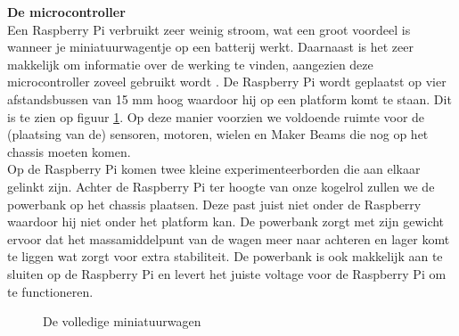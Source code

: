 \documentclass[a4paper,kulak]{kulakarticle}
\begin{document}
\noindent\textbf{\large De microcontroller}\
\\
Een Raspberry Pi verbruikt zeer weinig stroom, wat een groot voordeel is wanneer je miniatuurwagentje op een batterij werkt. Daarnaast is het zeer makkelijk om informatie over de werking te vinden, aangezien deze microcontroller zoveel gebruikt wordt \cite{rasp}.
De Raspberry Pi wordt geplaatst op vier afstandsbussen van 15 mm hoog waardoor hij op een platform komt te staan. Dit is te zien op figuur \ref{fig:afbchassis}. Op deze manier voorzien we voldoende ruimte voor de (plaatsing van de) sensoren, motoren, wielen en Maker Beams die nog op het chassis moeten komen. \\ Op de Raspberry Pi komen twee kleine experimenteerborden die aan elkaar gelinkt zijn. Achter de Raspberry Pi ter hoogte van onze kogelrol zullen we de powerbank op het chassis plaatsen. Deze past juist niet onder de Raspberry waardoor hij niet onder het platform kan. De powerbank zorgt met zijn gewicht ervoor dat het massamiddelpunt van de wagen meer naar achteren en lager komt te liggen wat zorgt voor extra stabiliteit. De powerbank is ook makkelijk aan te sluiten op de Raspberry Pi en levert het juiste voltage voor de Raspberry Pi om te functioneren. 

\begin{figure} [h]


	
	\caption{De volledige miniatuurwagen}\label{fig:afbchassis}
\end{figure}
\end{document}
